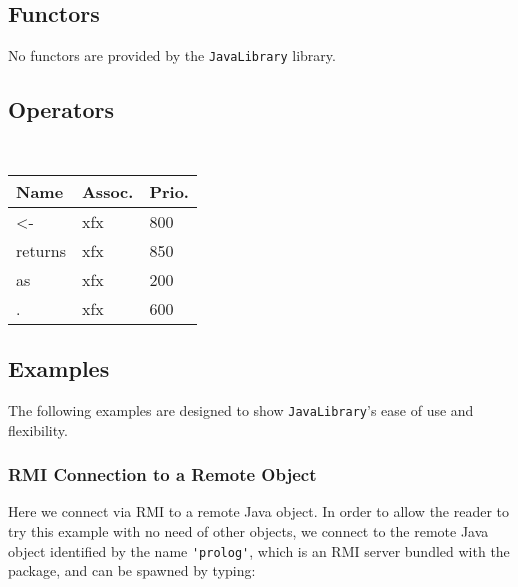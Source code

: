 \subsection{Functors}

No functors are provided by the \texttt{JavaLibrary} library.

\subsection{Operators}

\begin{table}[h]
    \begin{center}{\small\tt
    \begin{tabular}{p{2cm}|p{1cm}|p{1cm}}\hline\hline
    Name & Assoc. & Prio. \\ \hline\hline
    <-   & xfx & 800\\
    returns     & xfx & 850 \\
    as   & xfx & 200\\
    .   & xfx & 600\\
    \hline\hline
    \end{tabular}
    }\end{center}
\end{table}



\subsection{Examples}

The following examples are designed to show \texttt{JavaLibrary}'s
ease of use and flexibility.

\subsubsection{RMI Connection to a Remote Object}

Here we connect via RMI to a remote Java object.
%
In order to allow the reader to try this example with no need of
other objects, we connect to the remote Java object identified by
the name \verb|'prolog'|, which is an RMI server bundled with
the \tuprolog{} package, and can be spawned by typing:

